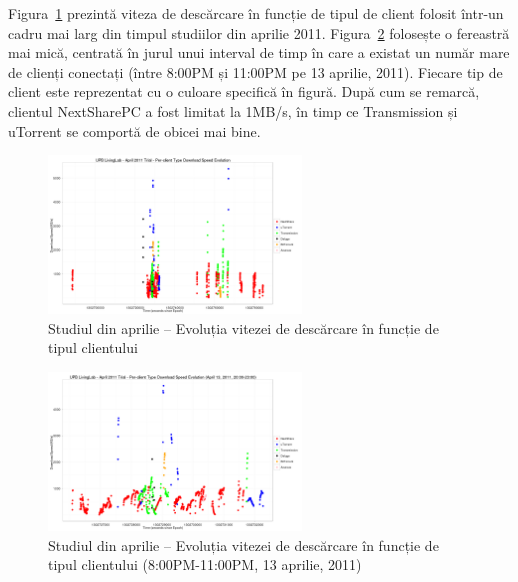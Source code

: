 Figura~\ref{fig:multimedia-dist:ds-evolution-full} prezintă viteza de
descărcare în funcție de tipul de client folosit într-un cadru mai larg din
timpul studiilor din aprilie 2011.
Figura~\ref{fig:multimedia-dist:ds-evolution-day} folosește o fereastră mai
mică, centrată în jurul unui interval de timp în care a existat un număr mare
de clienți conectați (între 8:00PM și 11:00PM pe 13 aprilie, 2011).  Fiecare
tip de client este reprezentat cu o culoare specifică în figură. După cum se
remarcă, clientul NextSharePC a fost limitat la 1MB/s, în timp ce Transmission
și uTorrent se comportă de obicei mai bine.

\begin{figure}
  \centering
  \includegraphics[width=0.6\textwidth]{src/img/multimedia-dist/ds-evolution-full}
  \caption{Studiul din aprilie -- Evoluția vitezei de descărcare în funcție de
	  tipul clientului}
  \label{fig:multimedia-dist:ds-evolution-full}
\end{figure}

\begin{figure}
  \centering
  \includegraphics[width=0.6\textwidth]{src/img/multimedia-dist/ds-evolution-day}
  \caption{Studiul din aprilie -- Evoluția vitezei de descărcare în funcție de
	  tipul clientului (8:00PM-11:00PM, 13 aprilie, 2011)}
  \label{fig:multimedia-dist:ds-evolution-day}
\end{figure}

